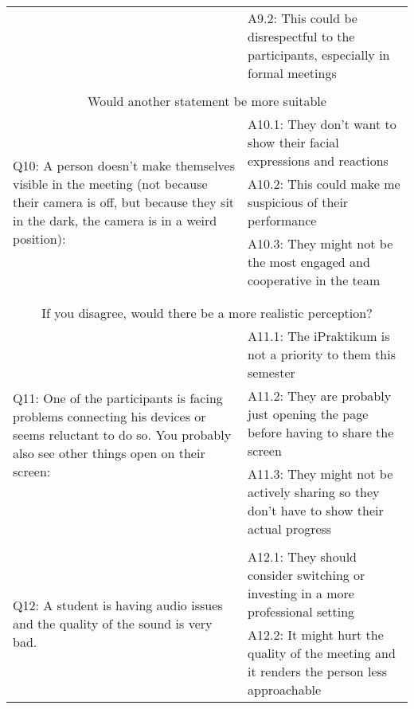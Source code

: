 \begin{longtable}{|  p{}  |  p{} |}
    & \hspace{0.3cm} A9.2: This could be disrespectful to the participants, especially in formal meetings 
  \\
  &  \\
\hline
\multicolumn{2}{|c|}{Would another statement be more suitable} \\
\hline
\multirow{3}{6cm}{Q10: A person doesn’t make themselves visible in the meeting (not because their camera is off, but because they sit in the dark, the camera is in a weird position):} & 
    \hspace{0.3cm} A10.1: They don’t want to show their facial expressions and reactions \\
    & \hspace{0.3cm} A10.2: This could make me suspicious of their performance \\
    & \hspace{0.3cm} A10.3: They might not be the most engaged and cooperative in the team
     \\ &  \\ & \\
\hline
\multicolumn{2}{|c|}{If you disagree, would there be a more realistic perception?} \\
\hline
\multirow{4}{6cm}{Q11: One of the participants is facing problems connecting his devices or seems reluctant to do so. You probably also see other things open on their screen:} & 
    \hspace{0.3cm} A11.1: The iPraktikum is not a priority to them this semester \\
    & \hspace{0.3cm} A11.2: They are probably just opening the page before having to share the screen \\
    & \hspace{0.3cm} A11.3: They might not be actively sharing so they don't have to show their actual progress
     \\
\hline
\multicolumn{2}{|c|}{Other reasons this might happen?} \\
\hline
\multirow{3}{6cm}{Q12: A student is having audio issues and the quality of the sound is very bad.} & 
    \hspace{0.3cm} A12.1: They should consider switching or investing in a more professional setting \\
    & \hspace{0.3cm} A12.2: It might hurt the quality of the meeting and it renders the person less approachable \\

\end{longtable}

